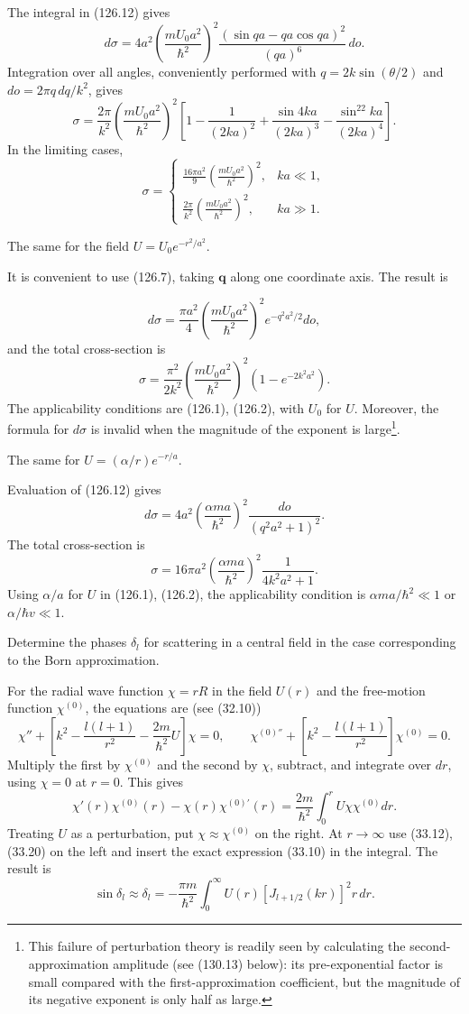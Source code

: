 \SolutionHeading The integral in (126.12) gives
\[
 d\sigma=4a^2\left(\frac{mU_0a^2}{\hbar^2}\right)^2
 \frac{(\sin qa-qa\cos qa)^2}{(qa)^6}\,do.
\]
Integration over all angles, conveniently performed with
$q=2k\sin(\theta/2)$ and $do=2\pi q\,dq/k^2$, gives
\[
 \sigma=\frac{2\pi}{k^2}\left(\frac{mU_0a^2}{\hbar^2}\right)^2
 \left[1-\frac1{(2ka)^2}+\frac{\sin4ka}{(2ka)^3}
 -\frac{\sin^22ka}{(2ka)^4}\right].
\]
In the limiting cases,
\[
 \sigma=\begin{cases}
 \displaystyle\frac{16\pi a^2}{9}
 \left(\frac{mU_0a^2}{\hbar^2}\right)^2,&ka\ll1,\\[4pt]
 \displaystyle\frac{2\pi}{k^2}
 \left(\frac{mU_0a^2}{\hbar^2}\right)^2,&ka\gg1.
 \end{cases}
\]

 The same for the field $U=U_0e^{-r^2/a^2}$.

\SolutionHeading It is convenient to use (126.7), taking $\mathbf q$ along
one coordinate axis. The result is

\[
 d\sigma=\frac{\pi a^2}{4}\left(\frac{mU_0a^2}{\hbar^2}\right)^2
 e^{-q^2a^2/2}do,
\]
and the total cross-section is
\[
 \sigma=\frac{\pi^2}{2k^2}\left(\frac{mU_0a^2}{\hbar^2}\right)^2
 (1-e^{-2k^2a^2}).
\]
The applicability conditions are (126.1), (126.2), with $U_0$ for $U$.
Moreover, the formula for $d\sigma$ is invalid when the magnitude of the
exponent is large\footnote{This failure of perturbation theory is readily seen
by calculating the second-approximation amplitude (see (130.13) below): its
pre-exponential factor is small compared with the first-approximation
coefficient, but the magnitude of its negative exponent is only half as
large.}.

 The same for $U=(\alpha/r)e^{-r/a}$.

\SolutionHeading Evaluation of (126.12) gives
\[
 d\sigma=4a^2\left(\frac{\alpha ma}{\hbar^2}\right)^2
 \frac{do}{(q^2a^2+1)^2}.
\]
The total cross-section is
\[
 \sigma=16\pi a^2\left(\frac{\alpha ma}{\hbar^2}\right)^2
 \frac1{4k^2a^2+1}.
\]
Using $\alpha/a$ for $U$ in (126.1), (126.2), the applicability condition is
$\alpha ma/\hbar^2\ll1$ or $\alpha/\hbar v\ll1$.

 Determine the phases $\delta_l$ for scattering in a
central field in the case corresponding to the Born approximation.

\SolutionHeading For the radial wave function $\chi=rR$ in the field $U(r)$
and the free-motion function $\chi^{(0)}$, the equations are (see (32.10))
\[
 \chi''+\left[k^2-\frac{l(l+1)}{r^2}-\frac{2m}{\hbar^2}U\right]\chi=0,
 \qquad
 \chi^{(0)''}+\left[k^2-\frac{l(l+1)}{r^2}\right]\chi^{(0)}=0.
\]
Multiply the first by $\chi^{(0)}$ and the second by $\chi$, subtract, and
integrate over $dr$, using $\chi=0$ at $r=0$. This gives
\[
 \chi'(r)\chi^{(0)}(r)-\chi(r)\chi^{(0)'}(r)
 =\frac{2m}{\hbar^2}\int_0^rU\chi\chi^{(0)}dr.
\]
Treating $U$ as a perturbation, put $\chi\approx\chi^{(0)}$ on the right. At
$r\to\infty$ use (33.12), (33.20) on the left and insert the exact expression
(33.10) in the integral. The result is
\[
 \sin\delta_l\approx\delta_l=-\frac{\pi m}{\hbar^2}
 \int_0^\infty U(r)[J_{l+1/2}(kr)]^2r\,dr.
\]


